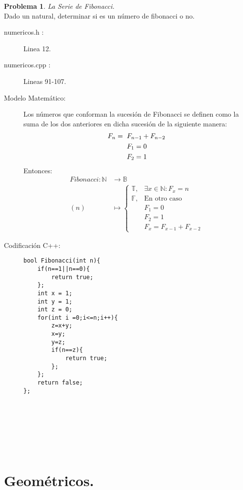 \documentclass{article}
\theoremstyle{plain}
\theoremstyle{definition}
\newtheorem{problem}{Problema}
\begin{document}
\begin{problem} \emph{La Serie de Fibonacci.}\\
\hspace*{7mm}Dado un natural, determinar si es un número de fibonacci o no.
%
\begin{description}
\item[numericos.h :] Linea 12. \item[numericos.cpp :] Lineas 91-107.

\item[Modelo Matemático:]
Los números que conforman la sucesión de Fibonacci se definen como la suma de los dos anteriores en dicha sucesión de la siguiente manera:
\begin{align*}
F_{n} = \hspace*{2mm} &F_{n-1}+F_{n-2}\\
&F_{1}=0\\
&F_{2}=1
\end{align*}
Entonces:\\
\begin{align*}
Fibonacci: \mathbb{N} &\to \mathbb{B}\\
(n) &\mapsto \begin{cases}
\mathbb{T},& \exists x \in \mathbb{N}:F_x = n \\
\mathbb{F},& \text{En otro caso}\\
&F_1 = 0\\
&F_2 = 1\\
&F_x = F_{x-1}+F_{x-2}
\end{cases}
\end{align*}
%
\item[Codificación \textsf{C++}:]\hfill
%
\begin{verbatim}
bool Fibonacci(int n){
    if(n==1||n==0){
        return true;
    };
    int x = 1;
    int y = 1;
    int z = 0;
    for(int i =0;i<=n;i++){
        z=x+y;
        x=y;
        y=z;
        if(n==z){
            return true;
        };
    };
    return false;
};








\end{verbatim}
\end{description}
\end{problem}

\section{Geométricos.}
\end{document}
